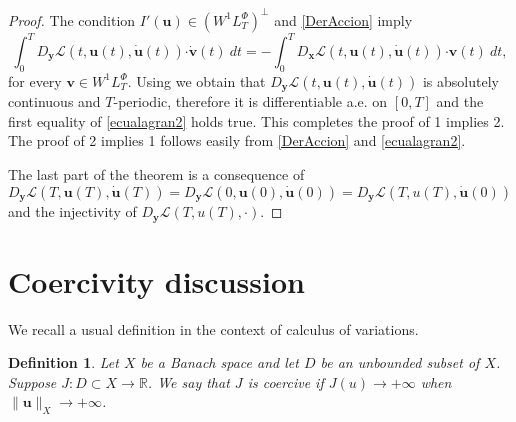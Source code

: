 \documentclass[twoside]{article}
\newtheorem{defi}[thm]{Definition}
\theoremstyle{remark}
\newcommand{\lphi}{L^{\Phi}}
\newcommand{\wphi}{W^{1}\lphi}
\renewcommand{\b}[1]{\boldsymbol{#1}}
\newcommand{\rr}{\mathbb{R}}
\newcommand{\ccdot}{\b{\cdot}}
\begin{document}
\begin{proof} The condition  $I'(\b{u})\in\left( \wphi_T\right)^{\perp}$ and \eqref{DerAccion} imply 
\[\int_0^T  D_{\b{y}} \mathcal{L}(t,\b{u}(t),\b{\dot{u}}(t))\ccdot \b{\dot{v}}(t)\ dt
=-\int_0^T  D_{\b{x}}\mathcal{L}(t,\b{u}(t),\b{\dot{u}}(t)) \ccdot\b{ v}(t)\ dt, \]
for every $\b{v}\in \wphi_T$. Using \cite[pp. 6-7]{mawhin2010critical} we obtain that  $D_{\b{y}}\mathcal{L}(t,\b{u}(t),\b{\dot{u}}(t))$ is absolutely continuous and 
$T$-periodic, therefore it is differentiable a.e. on $[0,T]$ and the first equality of \eqref{ecualagran2} holds true.
This completes the proof of  1 implies 2. The proof of 2 implies  1  follows easily 
from \eqref{DerAccion}  and \eqref{ecualagran2}.

The last part of the theorem is a consequence of 
$D_{\b{y}}\mathcal{L}(T,\b{u}(T),\b{\dot{u}}(T))=D_{\b{y}}\mathcal{L}(0,\b{u}(0),\b{\dot{u}}(0))=D_{\b{y}}\mathcal{L}(T,u(T),\b{\dot{u}}(0))$ and the injectivity of $D_{\b{y}}\mathcal{L}(T,u(T),\cdot)$.
\end{proof}


\section{Coercivity discussion}\label{sec:coer}

We recall a usual definition in the context of calculus of variations. 

\begin{defi} Let $X$ be a Banach space and let $D$ be an unbounded subset of $X$. Suppose $J:D\subset X\to\rr$. We say that $J$ is \emph{coercive} if $J(u)\to +\infty$ when  $\|\b{u}\|_X\to +\infty$. 
\end{defi}
\end{document}
